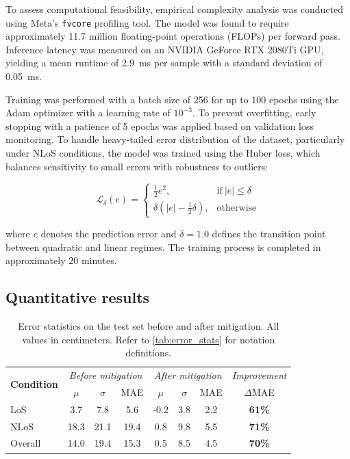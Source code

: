 To assess computational feasibility, empirical complexity analysis was conducted using Meta's \texttt{fvcore} profiling tool. The model was found to require approximately 11.7 million floating-point operations (FLOPs) per forward pass. Inference latency was measured on an NVIDIA GeForce RTX 2080Ti GPU, yielding a mean runtime of \SI{2.9}{\milli\second} per sample with a standard deviation of \SI{0.05}{\milli\second}.

Training was performed with a batch size of 256 for up to 100 epochs using the Adam optimizer with a learning rate of $10^{-3}$. To prevent overfitting, early stopping with a patience of 5 epochs was applied based on validation loss monitoring. To handle heavy-tailed error distribution of the dataset, particularly under NLoS conditions, the model was trained using the Huber loss, which balances sensitivity to small errors with robustness to outliers:

\begin{equation} 
\mathcal{L}_{\delta}(e) = 
\begin{cases} 
\frac{1}{2}e^2, & \text{if}\ |e| \leq \delta\\
\delta \left(|e| - \frac{1}{2}\delta\right), & \text{otherwise} 
\end{cases} 
\end{equation}

where $e$ denotes the prediction error and $\delta = 1.0$ defines the transition point between quadratic and linear regimes. The training process is completed in approximately 20 minutes.

\subsection{Quantitative results}

\begin{table}[tbh] 
\centering 
\caption[Error statistics before and after mitigation.]{Error statistics on the test set before and after mitigation. All values in centimeters. Refer to \autoref{tab:error_stats} for notation definitions.} 
\label{tab:test_results} 
\begin{tabular}{lccc|ccc|c} 
\toprule 
\multirow{2}{*}{\textbf{Condition}} 
& \multicolumn{3}{c|}{\textit{Before mitigation}} 
& \multicolumn{3}{c|}{\textit{After mitigation}} 
& \textit{Improvement} \\
& $\mu$ & $\sigma$ & MAE & $\mu$ & $\sigma$ & MAE & $\Delta$MAE \\
\midrule 
LoS     & 3.7  & 7.8  & 5.6  & -0.2 & 3.8 & 2.2 & \textbf{61\%} \\
NLoS    & 18.3 & 21.1 & 19.4 & 0.8  & 9.8 & 5.5 & \textbf{71\%} \\
Overall & 14.0 & 19.4 & 15.3 & 0.5  & 8.5 & 4.5 & \textbf{70\%} \\
\bottomrule 
\end{tabular} 
\end{table}

